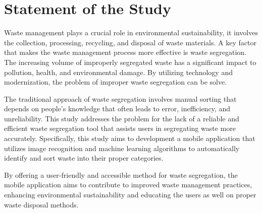\section{Statement of the Study}

Waste management plays a crucial role in environmental sustainability, it involves the collection, processing, recycling, and disposal of waste materials. A key factor that makes the waste management process more effective is waste segregation. The increasing volume of improperly segregated waste has a significant impact to pollution, health, and environmental damage. By utilizing technology and modernization, the problem of improper waste segregation can be solve.

The traditional approach of waste segregation involves manual sorting that depends on people’s knowledge that often leads to error, inefficiency, and unreliability. This study addresses the problem for the lack of a reliable and efficient waste segregation tool that assists users in segregating waste more accurately. Specifically, this study aims to development a mobile application that utilizes image recognition and machine learning algorithms to automatically identify and sort waste into their proper categories.

By offering a user-friendly and accessible method for waste segregation, the mobile application aims to contribute to improved waste management practices, enhancing environmental sustainability and educating the users as well on proper waste disposal methods.